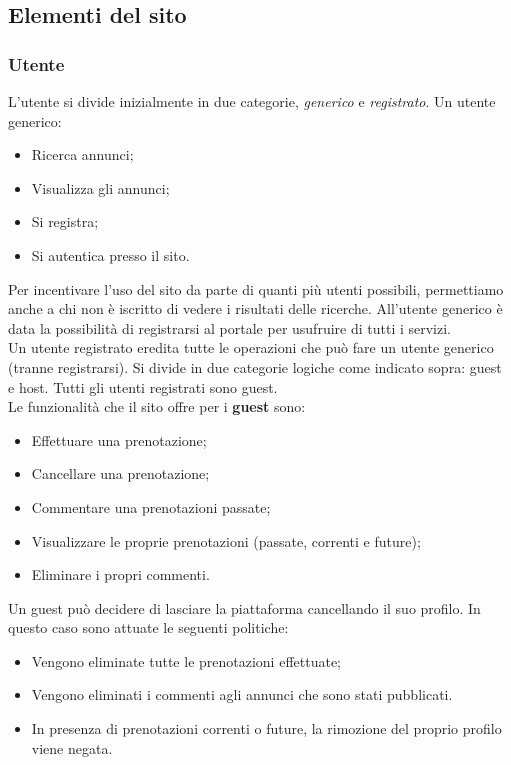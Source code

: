 \documentclass[1_relazione.tex]{subfiles}
\begin{document}
\subsection{Elementi del sito}

\subsubsection{Utente} 
L'utente si divide inizialmente in due categorie, \textit{generico} e \textit{registrato}. Un utente generico:
\begin{itemize}
\item Ricerca annunci;
\item Visualizza gli annunci;
\item Si registra;
 \item Si autentica presso il sito.
\end{itemize}
Per incentivare l'uso del sito da parte di quanti più utenti possibili, permettiamo anche a chi non è iscritto di vedere i risultati delle ricerche. All'utente generico è data la possibilità di registrarsi al portale per usufruire di tutti i servizi.  \\
Un utente registrato eredita tutte le operazioni che può fare un utente generico (tranne registrarsi). Si divide in due categorie logiche come indicato sopra: guest e host. Tutti gli utenti registrati sono guest.\\
Le funzionalità che il sito offre per i \textbf{guest} sono: 
\begin{itemize}
\item Effettuare una prenotazione;
\item Cancellare una prenotazione;
\item Commentare una prenotazioni passate;
\item Visualizzare le proprie prenotazioni (passate, correnti e future);
\item Eliminare i propri commenti.
\end{itemize}
Un guest può decidere di lasciare la piattaforma cancellando il suo profilo. In questo caso sono attuate le seguenti politiche:
\begin{itemize}
\item Vengono eliminate tutte le prenotazioni effettuate;
\item Vengono eliminati i commenti agli annunci che sono stati pubblicati.
\item In presenza di prenotazioni correnti o future, la rimozione del proprio profilo viene negata.
\end{itemize}
\end{document}
